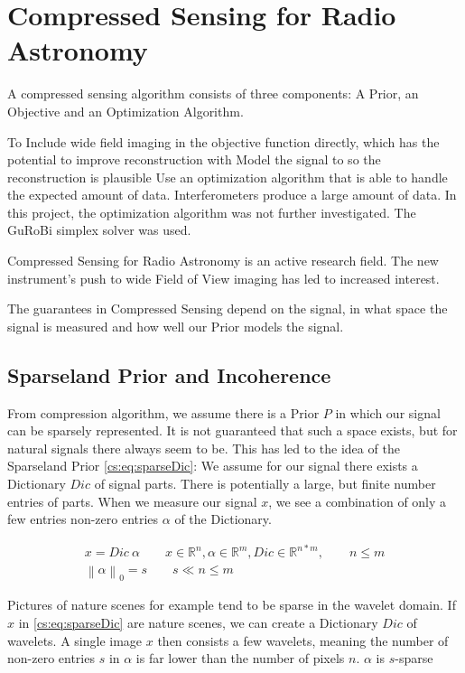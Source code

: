 \section{Compressed Sensing for Radio Astronomy} \label{cs}
A compressed sensing algorithm consists of three components: A Prior, an Objective and an Optimization Algorithm. 

To Include wide field imaging in the objective function directly, which has the potential to improve reconstruction with 
Model the signal to so the reconstruction is plausible
Use an optimization algorithm that is able to handle the expected amount of data. Interferometers produce a large amount of data. In this project, the optimization algorithm was not further investigated. The GuRoBi simplex solver was used.

Compressed Sensing for Radio Astronomy is an active research field. The new instrument's push to wide Field of View imaging has led to increased interest. 

The guarantees in Compressed Sensing depend on the signal, in what space the signal is measured and how well our Prior models the signal. 


\subsection{Sparseland Prior and Incoherence}
From compression algorithm, we assume there is a Prior $P$ in which our signal can be sparsely represented. It is not guaranteed that such a space exists, but for natural signals there always seem to be. This has led to the idea of the Sparseland Prior \eqref{cs:eq:sparseDic}: We assume for our signal there exists a Dictionary $Dic$ of signal parts. There is potentially a large, but finite number entries of parts. When we measure our signal $x$, we see a combination of only a few entries non-zero entries $\alpha$ of the Dictionary. 

\begin{equation} \label{cs:eq:sparseDic}
	\begin{split}
		x = Dic \: \alpha  \qquad  x \in \mathbb{R}^{n}, \alpha \in \mathbb{R}^{m}, Dic \in \mathbb{R}^{n*m}, \qquad n \leq m \\
		\left \| \alpha \right \|_0 = s \qquad s \ll n \leq m
	\end{split}
\end{equation}

Pictures of nature scenes for example tend to be sparse in the wavelet domain. If $x$ in \eqref{cs:eq:sparseDic} are nature scenes, we can create a Dictionary $Dic$ of wavelets. A single image $x$ then consists a few wavelets, meaning the number of non-zero entries $s$ in $\alpha$ is far lower than the number of pixels $n$. $\alpha$ is $s$-sparse


